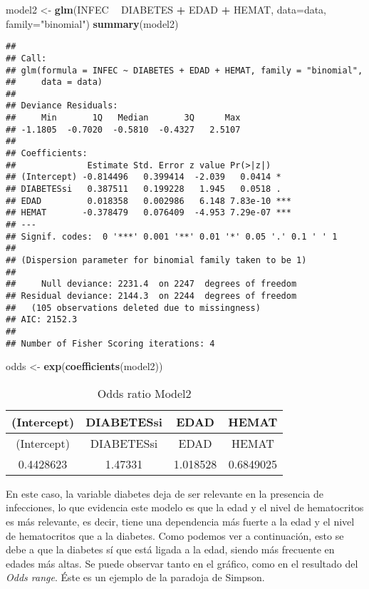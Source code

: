 \documentclass[]{article}
\newenvironment{Shaded}{\begin{snugshade}}{\end{snugshade}}
\newcommand{\DataTypeTok}[1]{\textcolor[rgb]{0.13,0.29,0.53}{#1}}
\newcommand{\KeywordTok}[1]{\textcolor[rgb]{0.13,0.29,0.53}{\textbf{#1}}}
\newcommand{\NormalTok}[1]{#1}
\newcommand{\OperatorTok}[1]{\textcolor[rgb]{0.81,0.36,0.00}{\textbf{#1}}}
\newcommand{\StringTok}[1]{\textcolor[rgb]{0.31,0.60,0.02}{#1}}
\begin{document}
\begin{Shaded}
\begin{Highlighting}[]
\NormalTok{model2 <-}\StringTok{ }\KeywordTok{glm}\NormalTok{(INFEC }\OperatorTok{~}\StringTok{ }\NormalTok{DIABETES }\OperatorTok{+}\StringTok{ }\NormalTok{EDAD }\OperatorTok{+}\StringTok{ }\NormalTok{HEMAT, }\DataTypeTok{data=}\NormalTok{data, }\DataTypeTok{family=}\StringTok{"binomial"}\NormalTok{)}
\KeywordTok{summary}\NormalTok{(model2)}
\end{Highlighting}
\end{Shaded}

\begin{verbatim}
## 
## Call:
## glm(formula = INFEC ~ DIABETES + EDAD + HEMAT, family = "binomial", 
##     data = data)
## 
## Deviance Residuals: 
##     Min       1Q   Median       3Q      Max  
## -1.1805  -0.7020  -0.5810  -0.4327   2.5107  
## 
## Coefficients:
##              Estimate Std. Error z value Pr(>|z|)    
## (Intercept) -0.814496   0.399414  -2.039   0.0414 *  
## DIABETESsi   0.387511   0.199228   1.945   0.0518 .  
## EDAD         0.018358   0.002986   6.148 7.83e-10 ***
## HEMAT       -0.378479   0.076409  -4.953 7.29e-07 ***
## ---
## Signif. codes:  0 '***' 0.001 '**' 0.01 '*' 0.05 '.' 0.1 ' ' 1
## 
## (Dispersion parameter for binomial family taken to be 1)
## 
##     Null deviance: 2231.4  on 2247  degrees of freedom
## Residual deviance: 2144.3  on 2244  degrees of freedom
##   (105 observations deleted due to missingness)
## AIC: 2152.3
## 
## Number of Fisher Scoring iterations: 4
\end{verbatim}

\begin{Shaded}
\begin{Highlighting}[]
\NormalTok{odds <-}\StringTok{ }\KeywordTok{exp}\NormalTok{(}\KeywordTok{coefficients}\NormalTok{(model2))}
\end{Highlighting}
\end{Shaded}

\begin{longtable}[]{@{}cccc@{}}
\caption{Odds ratio Model2}\tabularnewline
\toprule
(Intercept) & DIABETESsi & EDAD & HEMAT\tabularnewline
\midrule
\endfirsthead
\toprule
(Intercept) & DIABETESsi & EDAD & HEMAT\tabularnewline
\midrule
\endhead
0.4428623 & 1.47331 & 1.018528 & 0.6849025\tabularnewline
\bottomrule
\end{longtable}

En este caso, la variable diabetes deja de ser relevante en la presencia
de infecciones, lo que evidencia este modelo es que la edad y el nivel
de hematocritos es más relevante, es decir, tiene una dependencia más
fuerte a la edad y el nivel de hematocritos que a la diabetes. Como
podemos ver a continuación, esto se debe a que la diabetes sí que está
ligada a la edad, siendo más frecuente en edades más altas. Se puede
observar tanto en el gráfico, como en el resultado del \emph{Odds
range}. Éste es un ejemplo de la paradoja de Simpson.
\end{document}
